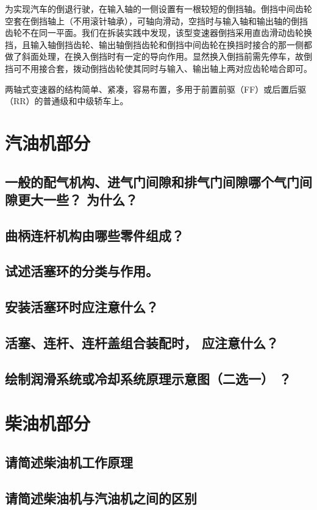 \documentclass[UTF8]{ctexart}
\numberwithin{figure}{section}
\numberwithin{table}{section}
\begin{document}
为实现汽车的倒退行驶，在输入轴的一侧设置有一根较短的倒挡轴。倒挡中间齿轮空套在倒挡轴上（不用滚针轴承），可轴向滑动，空挡时与输入轴和输出轴的倒挡齿轮不在同一平面。我们在拆装实践中发现，该型变速器倒挡采用直齿滑动齿轮换挡，且输入轴倒挡齿轮、输出轴倒挡齿轮和倒挡中间齿轮在换挡时接合的那一侧都做了斜面处理，在换入倒挡时有一定的导向作用。显然换入倒挡前需先停车，故倒挡可不用接合套，拨动倒挡齿轮使其同时与输入、输出轴上两对应齿轮啮合即可。

两轴式变速器的结构简单、紧凑，容易布置，多用于前置前驱（FF）或后置后驱（RR）的普通级和中级轿车上。

\newpage

\section{汽油机部分}
\subsection{一般的配气机构、进气门间隙和排气门间隙哪个气门间隙更大一些？ 为什么？}
\subsection{曲柄连杆机构由哪些零件组成？}
\subsection{试述活塞环的分类与作用。}
\subsection{安装活塞环时应注意什么？}
\subsection{活塞、连杆、连杆盖组合装配时， 应注意什么？}
\subsection{绘制润滑系统或冷却系统原理示意图（二选一） ？}
\newpage

\section{柴油机部分}
\subsection{请简述柴油机工作原理}
\subsection{请简述柴油机与汽油机之间的区别}
\end{document}
